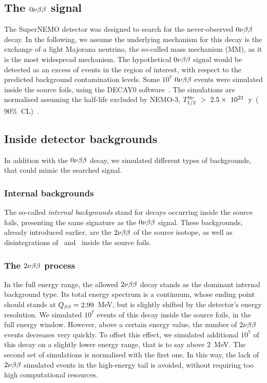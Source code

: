 
\subsection{The $0\nu\beta\beta$ signal}

The SuperNEMO detector was designed to search for the never-observed $0\nu\beta\beta$ decay.
In the following, we assume the underlying mechanism for this decay is the exchange of a light Majorana neutrino, the so-called mass mechanism (MM), as it is the most widespread mechanism.
The hypothetical $0\nu\beta\beta$ signal would be detected as an excess of events in the region of interest, with respect to the predicted background contamination levels.
Some $10^{7}$ $0\nu\beta\beta$ events were simulated inside the source foils, using the DECAY$0$ software~\cite{art:decay0}.
The simulations are normalised assuming the half-life excluded by NEMO-$3$, $T_{1/2}^{0\nu}~>~2.5\times~10^{23}$~y~($90\%$~CL)~\cite{art:NEMO2018}.

\subsection{Inside detector backgrounds}

In addition with the $0\nu\beta\beta$ decay, we simulated different types of backgrounds, that could mimic the searched signal.

\subsubsection{Internal backgrounds}

The so-called \emph{internal backgrounds} stand for decays occurring inside the source foils, presenting the same signature as the $0\nu\beta\beta$ signal.
These backgrounds, already introduced earlier, are the $2\nu\beta\beta$ of the source isotope, as well as disintegrations of \Tl\ and \Bi\ inside the source foils.


\subsubsection*{The $2\nu\beta\beta$ process}

In the full energy range, the allowed $2\nu\beta\beta$ decay stands as the dominant internal background type.
Its total energy spectrum is a continuum, whose ending point should stands at $Q_{\beta\beta} = 2.99$~MeV, but is slightly shifted by the detector's energy resolution.
We simulated $10^{7}$ events of this decay inside the source foils, in the full energy window.
However, above a certain energy value, the number of $2\nu\beta\beta$ events decreases very quickly.
To offset this effect, we simulated additional $10^{7}$ of this decay on a slightly lower energy range, that is to say above $2$~MeV.
The second set of simulations is normalised with the first one.
In this way, the lack of $2\nu\beta\beta$ simulated events in the high-energy tail is avoided, without requiring too high computational resources.

